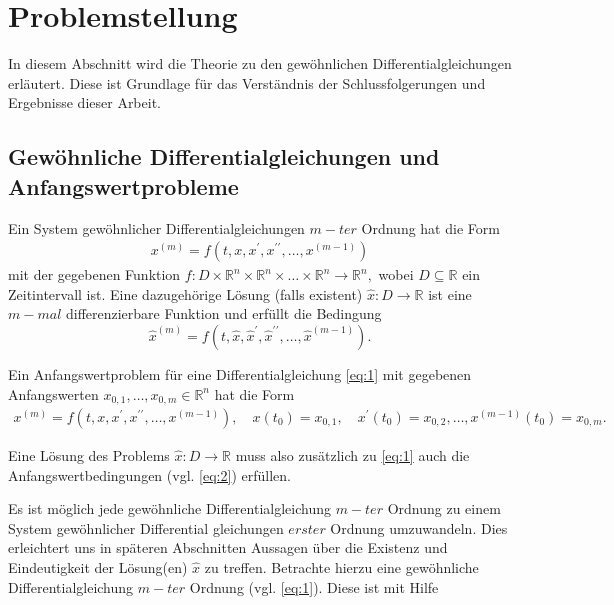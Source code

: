 \section{Problemstellung}
In diesem Abschnitt wird die Theorie zu den gewöhnlichen Differentialgleichungen erläutert. Diese ist Grundlage für
das Verständnis der Schlussfolgerungen und Ergebnisse dieser Arbeit.

\subsection{Gewöhnliche Differentialgleichungen und Anfangswertprobleme}
\begin{definition}
    Ein System gewöhnlicher Differentialgleichungen $m-ter$ Ordnung hat die Form
    \begin{align}
        x^{(m)} = f(t, x, x^{\prime}, x^{\prime\prime}, \dots, x^{(m-1)}) \label{eq:1}
    \end{align}
    mit der gegebenen Funktion
    $
    f : D \times \mathbb{R}^{n} \times \mathbb{R}^{n} \times \dots \times \mathbb{R}^{n} \rightarrow \mathbb{R}^{n},
    $
    wobei $D \subseteq \mathbb{R}$ ein Zeitintervall ist. Eine dazugehörige Lösung (falls existent)
    $\hat{x} : D \rightarrow \mathbb{R}$ ist eine $m-mal$ differenzierbare Funktion und erfüllt die Bedingung
    \[
        \hat{x}^{(m)} = f(t, \hat{x},\hat{x}^{\prime},\hat{x}^{\prime\prime}, \dots,\hat{x}^{(m-1)}).
    \]
\end{definition}
\begin{definition}
    Ein Anfangswertproblem für eine Differentialgleichung \eqref{eq:1} mit gegebenen Anfangswerten $x_{0,1},
    \dots,x_{0,m} \in \mathbb{R}^{n}$ hat die Form
    \begin{align}
        x^{(m)} = f(t, x, x^{\prime}, x^{\prime\prime}, \dots, x^{(m-1)}),\quad x(t_{0})=x_{0,1},\quad x^{\prime}(t_{0})=x_{0,2}
        ,\dots,x^{(m-1)}(t_{0})=x_{0,m}. \label{eq:2}
    \end{align}

    Eine Lösung des Problems $\hat{x} : D \rightarrow \mathbb{R}$ muss also zusätzlich zu \eqref{eq:1} auch die
    Anfangswertbedingungen (vgl. \eqref{eq:2}) erfüllen.
\end{definition}
Es ist möglich jede gewöhnliche Differentialgleichung $m-ter$ Ordnung zu einem System gewöhnlicher Differential
gleichungen $erster$ Ordnung umzuwandeln. Dies erleichtert uns in späteren Abschnitten Aussagen über die Existenz
und Eindeutigkeit der Lösung(en) $\hat{x}$ zu treffen.
Betrachte hierzu eine gewöhnliche Differentialgleichung $m-ter$ Ordnung (vgl. \eqref{eq:1}). Diese ist mit Hilfe
